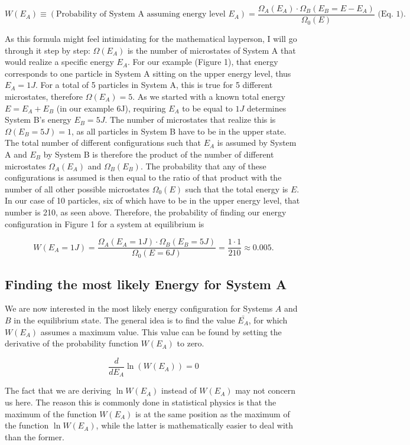 $$W(E_A) \equiv (\text{Probability of System A assuming energy level }E_A) = \frac{\Omega_A(E_A)\cdot \Omega_B(E_B = E -E_A)}{\Omega_0(E)} \text{     (Eq. 1)}.$$

As this formula might feel intimidating for the mathematical layperson, I will go through it step by step:
$\Omega(E_A)$ is the number of microstates of System A that would realize a specific energy $E_A$. For our example (Figure 1), that energy corresponds to one particle in System A sitting on the upper energy level, thus $E_A = 1J$. For a total of 5 particles in System A, this is true for 5 different microstates, therefore $\Omega(E_A) = 5$. As we started with a known total energy $E = E_A + E_B$ (in our example 6J), requiring $E_A$ to be equal to $1J$ determines System B's energy $E_B = 5J$. The number of microstates that realize this is $\Omega(E_B = 5J) = 1$, as all particles in System B have to be in the upper state. The total number of different configurations such that $E_A$ is assumed by System A and $E_B$ by System B is therefore the product of the number of different microstates $\Omega_A(E_A)$ and $\Omega_B(E_B)$. The probability that any of these configurations is assumed is then equal to the ratio of that product with the number of all other possible microstates $\Omega_0(E)$ such that the total energy is $E$. In our case of 10 particles, six of which have to be in the upper energy level, that number is 210, as seen above. Therefore, the probability of finding our energy configuration in Figure 1 for a system at equilibrium is

$$W(E_A = 1J) = \frac{\Omega_A(E_A = 1 J)\cdot \Omega_B(E_B = 5J)}{\Omega_0(E = 6J)} = \frac{1\cdot 1}{210} \approx 0.005.$$

\subsection{Finding the most likely Energy for System A}

We are now interested in the most likely energy configuration for Systems $A$ and $B$ in the equilibrium state. The general idea is to find the value $\bar{E_A}$, for which $W(E_A)$ assumes a maximum value. This value can be found by setting the derivative of the probability function $W(E_A)$ to zero.

$$\frac{d}{d E_A} \ln (W(E_A)) = 0$$

The fact that we are deriving $\ln W(E_A)$ instead of $W(E_A)$ may not concern us here. The reason this is commonly done in statistical physics is that the maximum of the function $W(E_A)$ is at the same position as the maximum of the function $\ln W(E_A)$, while the latter is mathematically easier to deal with than the former. 

